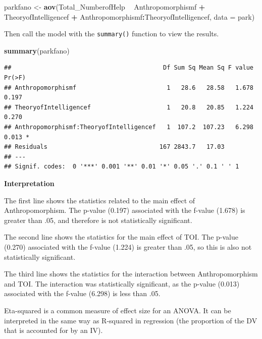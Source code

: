 \documentclass[
]{book}
\newenvironment{Shaded}{\begin{snugshade}}{\end{snugshade}}
\newcommand{\DataTypeTok}[1]{\textcolor[rgb]{0.13,0.29,0.53}{#1}}
\newcommand{\KeywordTok}[1]{\textcolor[rgb]{0.13,0.29,0.53}{\textbf{#1}}}
\newcommand{\NormalTok}[1]{#1}
\newcommand{\OperatorTok}[1]{\textcolor[rgb]{0.81,0.36,0.00}{\textbf{#1}}}
\newcommand{\StringTok}[1]{\textcolor[rgb]{0.31,0.60,0.02}{#1}}
\begin{document}
\begin{Shaded}
\begin{Highlighting}[]
\NormalTok{parkfano <-}\StringTok{ }\KeywordTok{aov}\NormalTok{(Total_NumberofHelp }\OperatorTok{~}\StringTok{ }\NormalTok{Anthropomorphismf }\OperatorTok{+}\StringTok{ }\NormalTok{TheoryofIntelligencef }\OperatorTok{+}\StringTok{ }\NormalTok{Anthropomorphismf}\OperatorTok{:}\NormalTok{TheoryofIntelligencef, }\DataTypeTok{data =}\NormalTok{ park)}
\end{Highlighting}
\end{Shaded}

Then call the model with the \texttt{summary()} function to view the results.

\begin{Shaded}
\begin{Highlighting}[]
\KeywordTok{summary}\NormalTok{(parkfano)}
\end{Highlighting}
\end{Shaded}

\begin{verbatim}
##                                          Df Sum Sq Mean Sq F value Pr(>F)  
## Anthropomorphismf                         1   28.6   28.58   1.678  0.197  
## TheoryofIntelligencef                     1   20.8   20.85   1.224  0.270  
## Anthropomorphismf:TheoryofIntelligencef   1  107.2  107.23   6.298  0.013 *
## Residuals                               167 2843.7   17.03                 
## ---
## Signif. codes:  0 '***' 0.001 '**' 0.01 '*' 0.05 '.' 0.1 ' ' 1
\end{verbatim}

\textbf{Interpretation}

The first line shows the statistics related to the main effect of Anthropomorphism. The p-value (0.197) associated with the f-value (1.678) is greater than .05, and therefore is not statistically significant.

The second line shows the statistics for the main effect of TOI. The p-value (0.270) associated with the f-value (1.224) is greater than .05, so this is also not statistically significant.

The third line shows the statistics for the interaction between Anthropomorphism and TOI. The interaction was statistically significant, as the p-value (0.013) associated with the f-value (6.298) is less than .05.

Eta-squared is a common measure of effect size for an ANOVA. It can be interpreted in the same way as R-squared in regression (the proportion of the DV that is accounted for by an IV).
\end{document}
